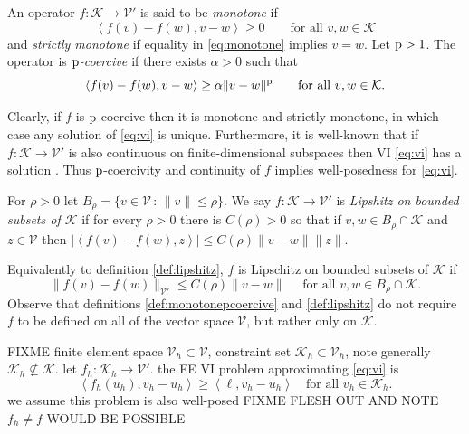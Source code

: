 \documentclass[hidelinks,onefignum,onetabnum,final]{siamart220329}  %
\newcommand{\cK}{\mathcal{K}}
\newcommand{\cV}{\mathcal{V}}
\newcommand{\pp}{{\text{\textnormal{p}}}}
\newcommand{\ip}[2]{\left<#1,#2\right>}
\begin{document}
\begin{definition} \label{def:monotonepcoercive}
An operator $f:\cK \to \cV'$ is said to be \emph{monotone} if
\begin{equation}
\ip{f(v)-f(w)}{v-w} \ge 0 \qquad \text{for all } v,w \in \cK \label{eq:monotone}
\end{equation}
and \emph{strictly monotone} if equality in \eqref{eq:monotone} implies $v=w$.  Let $\pp>1$.  The operator is \emph{$\pp$-coercive \cite{Bueler2021conservation}} if there exists $\alpha>0$ such that
\begin{equation}
\ip{f(v)-f(w)}{v-w} \ge \alpha \|v-w\|^\pp \qquad \text{for all } v,w \in \cK. \label{eq:pcoercive}
\end{equation}
\end{definition}

Clearly, if $f$ is $\pp$-coercive then it is monotone and strictly monotone, in which case any solution of \eqref{eq:vi} is unique.  Furthermore, it is well-known that if $f:\cK \to \cV'$ is also continuous on finite-dimensional subspaces then VI \eqref{eq:vi} has a solution \cite[Corollary III.1.8]{KinderlehrerStampacchia1980}.  Thus $\pp$-coercivity and continuity of $f$ implies well-posedness for \eqref{eq:vi}.

\begin{definition} \label{def:lipshitz}
For $\rho>0$ let $B_\rho = \{v\in \cV\,:\,\|v\|\le \rho\}$.  We say $f:\cK \to \cV'$ is \emph{Lipshitz on bounded subsets of $\cK$} if for every $\rho>0$ there is $C(\rho)>0$ so that if $v,w \in B_\rho \cap \cK$ and $z\in\cV$ then $|\ip{f(v)-f(w)}{z}| \le C(\rho) \|v-w\| \|z\|$.
\end{definition}

Equivalently to definition \ref{def:lipshitz}, $f$ is Lipschitz on bounded subsets of $\cK$ if
\begin{equation}
\|f(v)-f(w)\|_{\cV'} \le C(\rho) \|v-w\| \quad \text{ for all } v,w \in B_\rho \cap \cK.  \label{eq:liponbounded}
\end{equation}
Observe that definitions \ref{def:monotonepcoercive} and \ref{def:lipshitz} do not require $f$ to be defined on all of the vector space $\cV$, but rather only on $\cK$.

FIXME finite element space $\cV_h \subset \cV$, constraint set $\cK_h\subset \cV_h$, note generally $\cK_h \nsubseteq \cK$.  let $f_h:\cK_h\to\cV'$.  the FE VI problem approximating \eqref{eq:vi} is
\begin{equation}
\ip{f_h(u_h)}{v_h-u_h} \ge \ip{\ell}{v_h-u_h} \quad \text{for all } v_h\in \cK_h. \label{eq:fe:vi}
\end{equation}
we assume this problem is also well-posed FIXME FLESH OUT AND NOTE $f_h\ne f$ WOULD BE POSSIBLE
\end{document}
